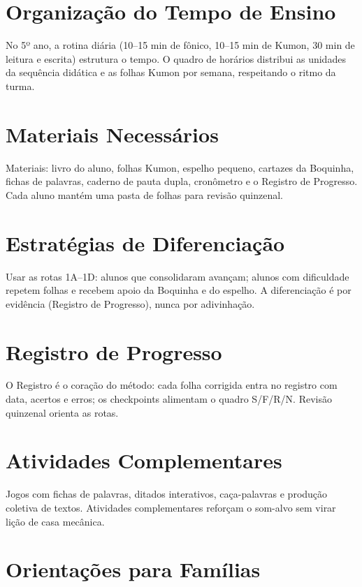 
\chapter{Organização do Tempo de Ensino}

No 5º ano, a rotina diária (10–15 min de fônico, 10–15 min de Kumon, 30 min de leitura e escrita) estrutura o tempo. O quadro de horários distribui as unidades da sequência didática e as folhas Kumon por semana, respeitando o ritmo da turma.


\chapter{Materiais Necessários}

Materiais: livro do aluno, folhas Kumon, espelho pequeno, cartazes da Boquinha, fichas de palavras, caderno de pauta dupla, cronômetro e o Registro de Progresso. Cada aluno mantém uma pasta de folhas para revisão quinzenal.


\chapter{Estratégias de Diferenciação}

Usar as rotas 1A–1D: alunos que consolidaram avançam; alunos com dificuldade repetem folhas e recebem apoio da Boquinha e do espelho. A diferenciação é por evidência (Registro de Progresso), nunca por adivinhação.


\chapter{Registro de Progresso}

O Registro é o coração do método: cada folha corrigida entra no registro com data, acertos e erros; os checkpoints alimentam o quadro S/F/R/N. Revisão quinzenal orienta as rotas.


\chapter{Atividades Complementares}

Jogos com fichas de palavras, ditados interativos, caça-palavras e produção coletiva de textos. Atividades complementares reforçam o som-alvo sem virar lição de casa mecânica.


\chapter{Orientações para Famílias}

